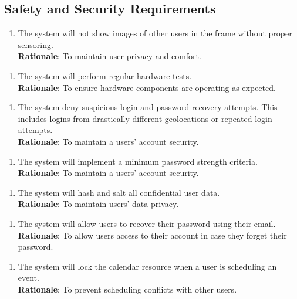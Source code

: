 \documentclass[12pt, titlepage]{article}
\begin{document}
\subsection{Safety and Security Requirements}
\begin{enumerate}[{SR}1. ]
    \item The system will not show images of other users in the frame without proper sensoring.\\
    \textbf{Rationale}: To maintain user privacy and comfort. 
\end{enumerate}
\begin{enumerate}[{SR}2. ]
    \item The system will perform regular hardware tests.\\
    \textbf{Rationale}: To ensure hardware components are operating as expected.
\end{enumerate}  
\begin{enumerate}[{SR}3. ]
    \item The system deny suspicious login and password recovery attempts. This includes logins from drastically different geolocations or repeated login attempts.\\
    \textbf{Rationale}: To maintain a users' account security. 
\end{enumerate} 
\begin{enumerate}[{SR}4. ]
    \item The system will implement a minimum password strength criteria.\\
    \textbf{Rationale}: To maintain a users' account security. 
\end{enumerate} 
\begin{enumerate}[{SR}5. ]
    \item The system will hash and salt all confidential user data.\\
    \textbf{Rationale}: To maintain users' data privacy. 
\end{enumerate} 
\begin{enumerate}[{SR}6. ]
    \item The system will allow users to recover their password using their email.\\
    \textbf{Rationale}: To allow users access to their account in case they forget their password. 
\end{enumerate}
\begin{enumerate}[{SR}7. ]
    \item The system will lock the calendar resource when a user is scheduling an event.\\
    \textbf{Rationale}: To prevent scheduling conflicts with other users.
\end{enumerate}  
\end{document}
